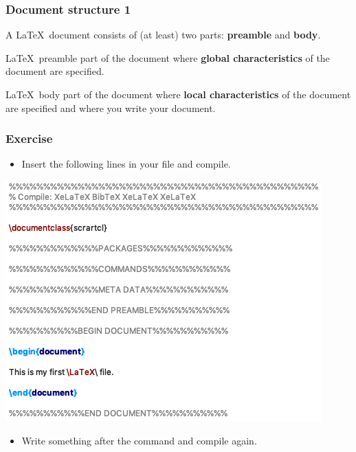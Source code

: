 \begin{frame}
\frametitle{Document structure 1}

A \LaTeX\ document consists of (at least) two parts: \textbf{preamble} and \textbf{body}.

\begin{block}{\LaTeX\ preamble}
	part of the document where \textbf{global characteristics} of the document are specified.
\end{block}

\begin{block}{\LaTeX\ body}
	part of the document where \textbf{local characteristics} of the document are specified and where you write your document.
\end{block}

\end{frame}



\begin{frame}[fragile]
\frametitle{Exercise}

\begin{itemize}
	\item Insert the following lines in your  file and compile.
\end{itemize}

\vspace{.25cm}

\centering
\includegraphics[scale=0.45]{../../texfiles-beamer/tex-material/WissArb-latex/xelatexTest1tex}

\begin{itemize}
	\item Write something after the \lstinline|| command and compile again.	
\end{itemize}

\end{frame}


